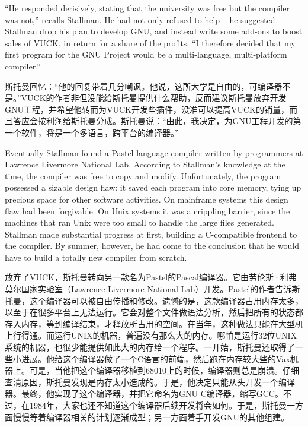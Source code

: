 \ifdefined\eng
``He responded derisively, stating that the university was free but the compiler was not,'' recalls Stallman. \ifdefined\vtwo He had not only refused to help -- he suggested Stallman drop his plan to develop GNU, and instead write some add-ons to boost sales of VUCK, in return for a share of the profits. \fi ``I therefore decided that my first program for the GNU Project would be a multi-language, multi-platform compiler.''\ifdefined\vone{}\fi\ifdefined\vtwo{}\fi
\fi

\ifdefined\chs
斯托曼回忆：``他的回复带着几分嘲讽。他说，这所大学是自由的，可编译器不是。\ifdefined\vtwo ''VUCK的作者非但没能给斯托曼提供什么帮助，反而建议斯托曼放弃开发GNU工程，并希望他转而为VUCK开发些插件，没准可以提高VUCK的销量，而且答应会按利润给斯托曼分成。斯托曼说：``\fi 由此，我决定，为GNU工程开发的第一个软件，将是一个多语言，跨平台的编译器\ifdefined\vone{}\fi\ifdefined\vwo{}\fi。''
\fi

\ifdefined\vone
\ifdefined\eng
Eventually Stallman found a Pastel language compiler written by programmers at Lawrence Livermore National Lab. According to Stallman's knowledge at the time, the compiler was free to copy and modify. Unfortunately, the program possessed a sizable design flaw: it saved each program into core memory, tying up precious space for other software activities. On mainframe systems this design flaw had been forgivable. On Unix systems it was a crippling barrier, since the machines that ran Unix were too small to handle the large files generated. Stallman made substantial progress at first, building a C-compatible frontend to the compiler. By summer, however, he had come to the conclusion that he would have to build a totally new compiler from scratch.
\fi

\ifdefined\chs
放弃了VUCK，斯托曼转向另一款名为Pastel的Pascal编译器。它由劳伦斯·利弗莫尔国家实验室（Lawrence Livermore National Lab）开发。Pastel的作者告诉斯托曼，这个编译器可以被自由传播和修改。遗憾的是，这款编译器占用内存太多，以至于在很多平台上无法运行。它会对整个文件做语法分析，然后把所有的状态都存入内存，等到编译结束，才释放所占用的空间。在当年，这种做法只能在大型机上行得通。而运行UNIX的机器，普遍没有那么大的内存。哪怕是运行32位UNIX系统的机器，也很少能提供如此大的内存给一个程序。一开始，斯托曼还取得了一些小进展。他给这个编译器做了一个C语言的前端，然后跑在内存较大些的Vax机器上。可是，当他把这个编译器移植到68010上的时候，编译器则总是崩溃。仔细查清原因，斯托曼发现是内存太小造成的。于是，他决定只能从头开发一个编译器。最终，他实现了这个编译器，并把它命名为GNU C编译器，缩写GCC。不过，在1984年，大家也还不知道这个编译器后续开发将会如何。于是，斯托曼一方面慢慢等着编译器相关的计划逐渐成型；另一方面着手开发GNU的其他组建。
\fi
\fi

